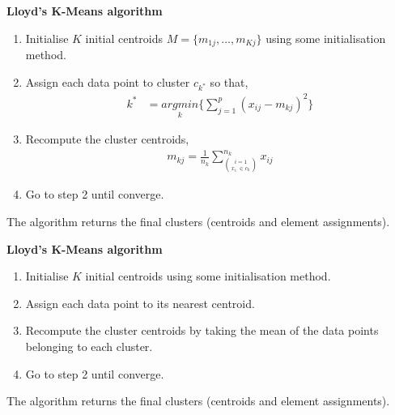 \documentclass[12pt]{article}
\begin{document}
\clearpage


\begin{center}
	\begin{tcolorbox}[breakable,colback=white!100!white,colframe=black!100!black]
		\noindent\textbf{Lloyd's K-Means algorithm}
		\begin{enumerate}
			\item Initialise $K$ initial centroids $M = \{m_{1j}, \dots, m_{Kj}\}$ using some initialisation method. 
			
			\item Assign each data point to cluster $c_{k^*}$ so that,
			\begin{align}\nonumber
			k^* &= \underset{k}{argmin}\bigg\{ \sum_{j=1}^{p} (x_{ij}-m_{kj})^2    \bigg\}
			\end{align}	
			
			\item Recompute the cluster centroids,
			\begin{align}\nonumber
			m_{kj} = \frac{1}{n_k}\sum_{\binom{i=1}{x_{i:} \in c_k}}^{n_k} x_{ij}
			\end{align}	
			
			\item Go to step 2 until converge.						
			
		\end{enumerate}	
		The algorithm returns the final clusters (centroids and element assignments).
	\end{tcolorbox}
\end{center}

\begin{center}
	\begin{tcolorbox}[breakable,colback=white!100!white,colframe=black!100!black]
		\noindent\textbf{Lloyd's K-Means algorithm}
		\begin{enumerate}
			\item Initialise $K$ initial centroids using some initialisation method. 
			
			\item Assign each data point to its nearest centroid. 
			
			\item Recompute the cluster centroids by taking the mean of the data points belonging to each cluster.
			
			\item Go to step 2 until converge.						
			
		\end{enumerate}	
		The algorithm returns the final clusters (centroids and element assignments).
	\end{tcolorbox}
\end{center}
\end{document}
